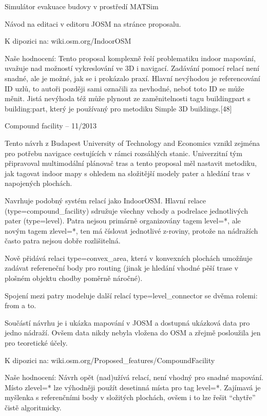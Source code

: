 Simulátor evakuace budovy v prostředí MATSim

Návod na editaci v editoru JOSM na stránce proposalu.

K dipozici na: wiki.osm.org/IndoorOSM

Naše hodnocení: Tento proposal komplexně řeší problematiku indoor mapování, uvažuje nad možností vykreslování ve 3D i navigací. Zadávání pomocí relací není snadné, ale je možné, jak se i prokázalo praxí. Hlavní nevýhodou je referencování ID uzlů, to autoři později sami označili za nevhodné, neboť toto ID se může měnit. Jistá nevýhoda též může plynout ze zaměnitelnosti tagu buildingpart s building:part, který je používaný pro metodiku Simple 3D buildings.[48]

Compound facility – 11/2013



Tento návrh z Budapest University of Technology and Economics vznikl zejména pro potřebu navigace cestujících v rámci rozsáhlých stanic. Univerzitní tým připravoval multimodální plánovač tras a tento proposal měl nastavit metodiku, jak tagovat indoor mapy s ohledem na složitější modely pater a hledání tras v napojených plochách.

Navrhuje podobný systém relací jako IndoorOSM. Hlavní relace (type=compound\_facility) sdružuje všechny vchody a podrelace jednotlivých pater (type=level). Patra nejsou primárně organizovány tagem level=*, ale novým tagem zlevel=*, ten má číslovat jednotlivé z-roviny, protože na nádražích často patra nejsou dobře rozlišitelná.

Nově přidává relaci type=convex\_area, která v konvexních plochách umožňuje zadávat refereneční body pro routing (jinak je hledání vhodné pěší trase v plošném objektu chodby poměrně náročné).

Spojení mezi patry modeluje další relací type=level\_connector se dvěma rolemi: from a to.

Součástí návrhu je i ukázka mapování v JOSM a dostupná ukázková data pro jedno nádraží. Ovšem data nikdy nebyla vložena do OSM a zřejmě posloužila jen pro teoretické účely.

K dipozici na: wiki.osm.org/Proposed\_features/CompoundFacility

Naše hodnocení: Návrh opět (nad)užívá relací, není vhodný pro snadné mapování. Místo zlevel=* lze výhodněji použít desetinná místa pro tag level=*. Zajímavá je myšlenka s referenčními body v složitých plochách, ovšem i to lze řešit “chytře” čistě algoritmicky.

